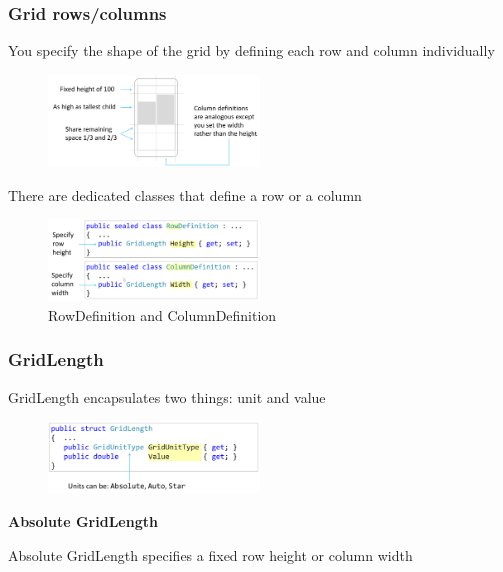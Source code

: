 \documentclass{article}
\newcommand{\bold}[1]{\textbf{#1}}
\begin{document}
\subsubsection{Grid rows/columns}

You specify the shape of the grid by defining each row and column individually

\begin{figure}[H]
    \centering
    \includegraphics[width=0.5\textwidth]{xaml-grid2.png}
    \caption{}
\end{figure}

There are dedicated classes that define a row or a column

\begin{figure}[H]
    \centering
    \includegraphics[width=0.5\textwidth]{xaml-grid-rowcol.png}
    \caption{RowDefinition and ColumnDefinition}
\end{figure}

\subsubsection{GridLength}

GridLength encapsulates two things: unit and value

\begin{figure}[H]
    \centering
    \includegraphics[width=0.5\textwidth]{xaml-grid-length.png}
    \caption{}
\end{figure}

\bold{Absolute GridLength}

Absolute GridLength specifies a fixed row height or column width
\end{document}
